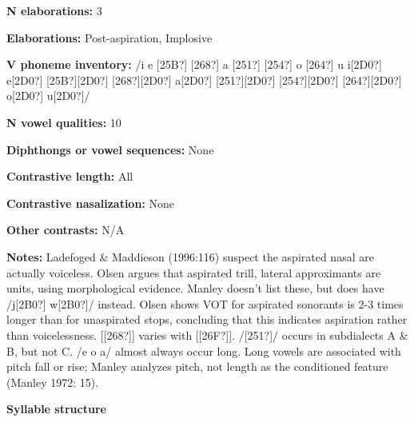 \begin{styleBody}
\textbf{N elaborations:} 3
\end{styleBody}

\begin{styleBody}
\textbf{Elaborations:} Post-aspiration, Implosive
\end{styleBody}

\begin{styleBody}
\textbf{V phoneme inventory:} /i e [25B?] [268?] a [251?] [254?] o [264?] u i[2D0?] e[2D0?] [25B?][2D0?] [268?][2D0?] a[2D0?] [251?][2D0?] [254?][2D0?] [264?][2D0?] o[2D0?] u[2D0?]/
\end{styleBody}

\begin{styleBody}
\textbf{N vowel qualities:} 10
\end{styleBody}

\begin{styleBody}
\textbf{Diphthongs or vowel sequences:} None
\end{styleBody}

\begin{styleBody}
\textbf{Contrastive length:} All
\end{styleBody}

\begin{styleBody}
\textbf{Contrastive nasalization:} None
\end{styleBody}

\begin{styleBody}
\textbf{Other contrasts:} N/A
\end{styleBody}

\begin{styleBody}
\textbf{Notes:} Ladefoged \& Maddieson (1996:116) suspect the aspirated nasal are actually voiceless. Olsen argues that aspirated trill, lateral approximants are units, using morphological evidence. Manley doesn’t list these, but does have /j[2B0?] w[2B0?]/ instead. Olsen shows VOT for aspirated sonorants is 2-3 times longer than for unaspirated stops, concluding that this indicates aspiration rather than voicelessness. [[268?]] varies with [[26F?]]. /[251?]/ occurs in subdialects A \& B, but not C. /e o a/ almost always occur long. Long vowels are associated with pitch fall or rise; Manley analyzes pitch, not length as the conditioned feature (Manley 1972: 15).
\end{styleBody}

\begin{styleBody}
\textbf{Syllable structure}
\end{styleBody}

